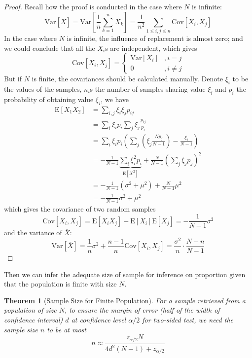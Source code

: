 \documentclass[12pt]{article}
\newtheorem{theorem}{Theorem}[section]
\def\Cov{\mathrm{Cov}}
\def\E{\mathrm{E}}
\def\Var{\mathrm{Var}}
\begin{document}
\begin{proof}
    Recall how the proof is conducted in the case where $N$ is infinite:
    $$
    \Var[\overline{X}] = \Var\left[\frac{1}{n}\sum\limits_{k=1}^n X_k\right] = \dfrac{1}{n^2} \sum_{1\leq i,j\leq n}\Cov[X_i, X_j]
    $$
    In the case where $N$ is infinite, the influence of replacement is almost zero; and we could conclude that all the $X_i$s are independent, which gives 
    $$
    \Cov[X_i, X_j] = \begin{cases}
        \Var[X_i] &, i = j\\
        0 &, i\neq j 
    \end{cases}
    $$
    But if $N$ is finite, the covariances should be calculated manually. Denote $\xi_i$ to be the values of the samples, $n_i$s the number of samples sharing value $\xi_i$ and $p_i$ the probability of obtaining value $\xi_i$, we have
    \begin{align*}
        \E[X_1 X_2] & = \sum\limits_{i, j}\xi_i \xi_j p_{ij} \\
                    & = \sum\limits_{i}\xi_i p_i \sum\limits_{j} \xi_j \frac{p_{ij}}{p_i} \\
                    & = \sum\limits_{i}\xi_i p_i \left(\sum\limits_{j}\left(\xi_j\frac{N p_j}{N-1}\right) - \frac{\xi_i}{N-1} \right) \\ 
                    & = -\frac{1}{N-1}\underset{\E[X^2]}{\underbrace{\sum\limits_{i}\xi_i^2 p_i}} + \frac{N}{N-1}\left(\sum\limits_{j}\xi_j p_j\right)^2 \\
                    & = -\frac{1}{N-1}\left(\sigma^2 + \mu^2\right) + \frac{N}{N-1}\mu^2 \\
                    & = -\frac{1}{N-1}\sigma^2 + \mu^2
    \end{align*}
    which gives the covariance of two random samples
    $$
    \Cov[X_i, X_j] = \E[X_i X_j] - \E[X_i]\E[X_j] = -\frac{1}{N-1}\sigma^2
    $$
    and the variance of $\overline{X}$:
    $$
    \Var[\overline{X}] = \frac{1}{n}\sigma^2 + \frac{n-1}{n}\Cov[X_i, X_j] = \dfrac{\sigma^2}{n}\cdot\dfrac{N-n}{N-1}
    $$
\end{proof}

Then we can infer the adequate size of sample for inference on proportion given that the population is finite with size $N$. 

\begin{theorem}[Sample Size for Finite Population]
    For a sample retrieved from a population of size $N$, to ensure the margin of error (half of the width of confidence interval) $d$ at confidence level $\alpha/2$ for two-sided test, we need the sample size $n$ to be at most
    \begin{equation}\label{ssfinite}
    n\approx \dfrac{z_{\alpha/2}N}{4d^2(N-1)+z_{\alpha/2}}
    \end{equation}
\end{theorem}
\end{document}
